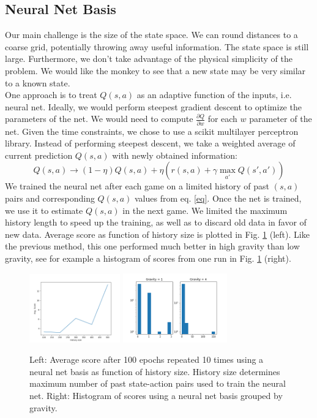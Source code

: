\documentclass[11pt]{article}
\begin{document}
\subsection{Neural Net Basis}
Our main challenge is the size of the state space. We can round distances to a coarse grid, potentially throwing away useful information. The state space is still large. Furthermore, we don't take advantage of the physical simplicity of the problem. We would like the monkey to see that a new state may be very similar to a known state.
\\One approach is to treat $Q(s,a)$ as an adaptive function of the inputs, i.e. neural net. Ideally, we would perform steepest gradient descent to optimize the parameters of the net. We would need to compute $\frac{\partial Q}{\partial w}$ for each $w$ parameter of the net. Given the time constraints, we chose to use a scikit multilayer perceptron library. Instead of performing steepest descent, we take a weighted average of current prediction $Q(s,a)$ with newly obtained information:
\begin{equation}Q(s,a)\rightarrow(1-\eta)Q(s,a)+\eta(r(s,a)+\gamma\max_{a'}Q(s',a'))\label{eq}\end{equation}
We trained the neural net after each game on a limited history of past $(s,a)$ pairs and corresponding $Q(s,a)$ values from eq. \ref{eq}. Once the net is trained, we use it to estimate $Q(s,a)$ in the next game. We limited the maximum history length to speed up the training, as well as to discard old data in favor of new data. Average score as function of history size is plotted in Fig. \ref{nn} (left). Like the previous method, this one performed much better in high gravity than low gravity, see for example a histogram of scores from one run in Fig. \ref{nn} (right).
\begin{figure}[] 
\centering
        \includegraphics[width=0.35\textwidth]{NN_plots/History_size.png}
        \includegraphics[width=0.4\textwidth]{NN_plots/NN_layers_5_5_eps_0_g_0_9_iter_100_histograms.png}
        \caption{Left: Average score after 100 epochs repeated 10 times using a neural net basis as function of history size. History size determines maximum number of past state-action pairs used to train the neural net. Right: Histogram of scores using a neural net basis grouped by gravity.}
            \label{nn}
\end{figure}
\end{document}
